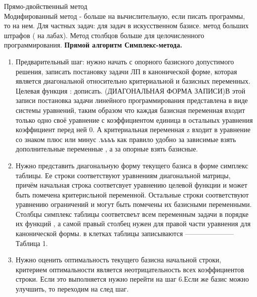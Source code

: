 Прямо-двойственный метод\\
Модифированный метод - больше на вычислительную, если писать программы, то на нем.
Для частных задач: для задач в искусственном базисе. метод больших штрафов ( на лабах).
Метод столбцов больше для целочисленного программирования.
\newpage
\textbf {Прямой алгоритм Симплекс-метода.}\\
\begin{enumerate}
  \item Предварительный шаг: нужно начать с опорного базисного допустимого решения, записать постановку задачи ЛП в канонической форме, которая является диагональной относительно критериальной и базисных переменных. Целевая функция : дописать. (ДИАГОНАЛЬНАЯ ФОРМА ЗАПИСИ)В этой записи постановка задачи линейного программирования представлена в виде системы уравнений, таким образом что каждая базисная переменная входит только одно своё уравнение с коэффициентом единица в остальных уравнения коэффициент перед ней 0. А критериальная переменная z входит в уравнение со знаком плюс или минус .ъъъъ как правило удобно за зависимые взять дополнительные переменные , а за опорные взять базисные.

  \item Нужно представить диагональную форму текущего базиса в форме симплекс таблицы. Ее строки соответствуют уравнениям диагональной матрицы, причём начальная строка соответсвует уравнению целевой функции и может быть помечена критерисльной переменной. Остальные строки соответствуют уравнению ограничений и могут быть помечены их базисными переменными. Столбцы симплекс таблицы соответсвеът всем переменным задачи в порядке их функций , а самой правый столбец нужен для правой части уравнения для канонической формы. в клетках таблицы записываются ——————— Таблица 1.

  \item   Нужно оценить оптимальность текущего базисна начальной строки, критерием оптимальности является неотрицательность всех коэффициентов строки. Если это выполняется нужно перейти на шаг 6.Если же базис можно улучшить, то переходим на след шаг.


\end{enumerate}
